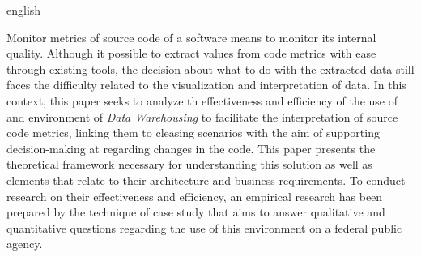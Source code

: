 \begin{resumo}[Abstract]
 \begin{otherlanguage*}{english}

Monitor metrics of source code of a software means to monitor its internal quality. Although it possible to extract values from code metrics with ease through existing tools, the decision about what to do with the extracted data still faces the difficulty related to the visualization and interpretation of data. In this context, this paper seeks to analyze th effectiveness and efficiency of the use of and environment of \textit{Data Warehousing} to facilitate the interpretation of source code metrics, linking them to cleasing scenarios with the aim of supporting decision-making at regarding changes in the code. This paper presents the theoretical framework necessary for understanding this solution as well as elements that relate to their architecture and business requirements. To conduct research on their effectiveness and efficiency, an empirical research has been prepared by the technique of case study that aims to answer qualitative and quantitative questions regarding the use of this environment on a federal public agency.
 

 \end{otherlanguage*}
\end{resumo}



 		